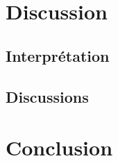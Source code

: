 \documentclass[a4paper,12pt,oneside]{article}
\begin{document}
\section{Discussion}%

\subsection{Interprétation}

\subsection{Discussions}
\section{Conclusion}






\begin{thebibliography}{99}
\end{thebibliography}
\end{document}
